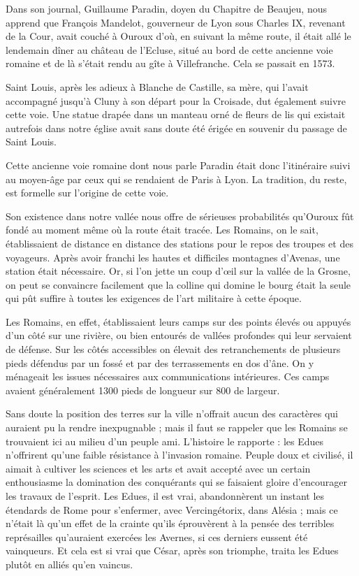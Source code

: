 \documentclass[11pt,a4paper]{report}
\begin{document}
Dans son journal, Guillaume Paradin, doyen du Chapitre de Beaujeu, nous apprend
que François Mandelot, gouverneur de Lyon sous Charles IX, revenant de la Cour,
avait couché à Ouroux d'où, en suivant la même route, il était allé le lendemain
dîner au château de l'Ecluse, situé au bord de cette ancienne voie romaine et de
là s'était rendu au gîte à Villefranche. Cela se passait en 1573.

Saint Louis, après les adieux à Blanche de Castille, sa mère, qui l'avait
accompagné jusqu'à Cluny à son départ pour la Croisade, dut également suivre
cette voie. Une statue drapée dans un manteau orné de fleurs de lis qui existait
autrefois dans notre église avait sans doute été érigée en souvenir du passage
de Saint Louis.

Cette ancienne voie romaine dont nous parle Paradin était donc l'itinéraire
suivi au moyen-âge par ceux qui se rendaient de Paris à Lyon. La tradition, du
reste, est formelle sur l'origine de cette voie.

Son existence dans notre vallée nous offre de sérieuses probabilités qu'Ouroux
fût fondé au moment même où la route était tracée. Les Romains, on le sait,
établissaient de distance en distance des stations pour le repos des troupes et
des voyageurs. Après avoir franchi les hautes et difficiles montagnes d'Avenas,
une station était nécessaire. Or, si l'on jette un coup d'œil sur la vallée de
la Grosne, on peut se convaincre facilement que la colline qui domine le bourg
était la seule qui pût suffire à toutes les exigences de l'art militaire à cette
époque.

Les Romains, en effet, établissaient leurs camps sur des points élevés ou
appuyés d'un côté sur une rivière, ou bien entourés de vallées profondes qui
leur servaient de défense. Sur les côtés accessibles on élevait des
retranchements de plusieurs pieds défendus par un fossé et par des terrassements
en dos d'âne. On y ménageait les issues nécessaires aux communications
intérieures. Ces camps avaient généralement 1300 pieds de longueur sur 800 de
largeur.

Sans doute la position des terres sur la ville n'offrait aucun
des caractères qui auraient pu la rendre inexpugnable ; mais il faut se rappeler
que les Romains se trouvaient ici au milieu d'un peuple ami. L'histoire le
rapporte : les Edues n'offrirent qu'une faible résistance à l'invasion romaine.
Peuple doux et civilisé, il aimait à cultiver les sciences et les arts et avait
accepté avec un certain enthousiasme la domination des conquérants qui se
faisaient gloire d'encourager les travaux de l'esprit. Les Edues, il est vrai,
abandonnèrent un instant les étendards de Rome pour s'enfermer, avec
Vercingétorix, dans Alésia ; mais ce n'était là qu'un effet de la crainte qu'ils
éprouvèrent à la pensée des terribles représailles qu'auraient exercées les
Avernes, si ces derniers eussent été vainqueurs. Et cela est si vrai que César,
après son triomphe, traita les Edues plutôt en alliés qu'en vaincus.
\end{document}
